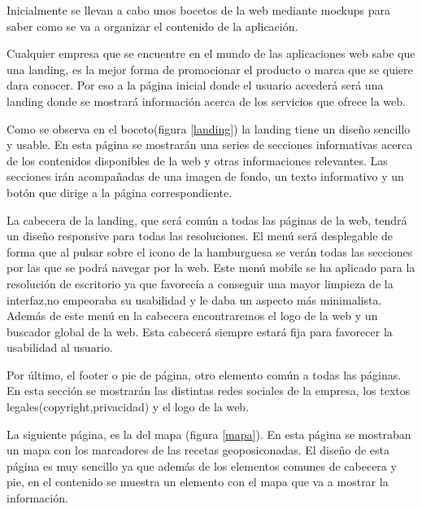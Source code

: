 Inicialmente se llevan a cabo unos bocetos de la web mediante mockups para saber como se va a organizar el contenido de la aplicación.

\vspace{5 mm}

Cualquier empresa que se encuentre en el mundo de las aplicaciones web sabe que una landing, es la mejor forma de promocionar el producto o marca que se quiere dara conocer. Por eso a la página inicial donde el usuario accederá será una landing donde se mostrará información acerca de los servicios que ofrece la web.

\vspace{5 mm}

Como se observa en el boceto(figura \ref{landing}) la landing tiene un diseño sencillo y usable. En esta página se mostrarán una series de secciones informativas acerca de los contenidos disponibles de la web y otras informaciones relevantes. Las secciones irán acompañadas de una imagen de fondo, un texto informativo y un botón que dirige a la página correspondiente.

\vspace{5 mm}

La cabecera de la landing, que será común a todas las páginas de la web, tendrá un diseño responsive para todas las resoluciones. El menú será desplegable de forma que al pulsar sobre el icono de  la hamburguesa se verán todas las secciones por las que se podrá navegar por la web. Este menú mobile se ha aplicado para la resolución de escritorio ya que favorecía a conseguir una mayor limpieza de la interfaz,no empeoraba su usabilidad y le daba un aspecto más minimalista. Además de este menú en la cabecera encontraremos el logo de la web y un buscador global de la web. Esta cabecerá siempre estará fija para favorecer la usabilidad al usuario.

\vspace{5 mm}

Por último, el footer o pie de página, otro elemento común a todas las páginas. En esta sección se mostrarán las distintas redes sociales de la empresa, los textos legales(copyright,privacidad) y el logo de la web.


\vspace{5 mm}

La siguiente página, es la del mapa (figura \ref{mapa}). En esta página se mostraban un mapa con los marcadores de las recetas geoposiconadas. El diseño de esta página es muy sencillo ya que además de los elementos comunes de cabecera y pie, en el contenido se muestra un elemento con el mapa que va a mostrar la información.

